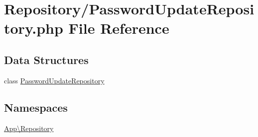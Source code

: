 \hypertarget{_password_update_repository_8php}{}\section{Repository/\+Password\+Update\+Repository.php File Reference}
\label{_password_update_repository_8php}
\subsection*{Data Structures}
\begin{DoxyCompactItemize}
\item 
class \mbox{\hyperlink{class_app_1_1_repository_1_1_password_update_repository}{Password\+Update\+Repository}}
\end{DoxyCompactItemize}
\subsection*{Namespaces}
\begin{DoxyCompactItemize}
\item 
 \mbox{\hyperlink{namespace_app_1_1_repository}{App\textbackslash{}\+Repository}}
\end{DoxyCompactItemize}
